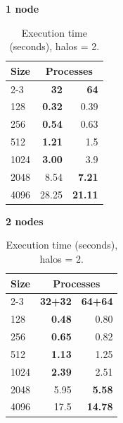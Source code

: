 \begin{table}[H]
\centering
\begin{minipage}[t]{0.48\textwidth}
\centering
\textbf{1 node}\\
\begin{tabular}{l|rr}
\hline
\textbf{Size} & \multicolumn{2}{c}{\textbf{Processes}} \\
\cline{2-3}
 & \textbf{32} & \textbf{64} \\
\hline
128 & \textbf{0.32} & 0.39 \\
256 & \textbf{0.54} & 0.63 \\
512 & \textbf{1.21} & 1.5 \\
1024 & \textbf{3.00} & 3.9 \\
2048 & 8.54 & \textbf{7.21} \\
4096 & 28.25 & \textbf{21.11} \\
\hline
\end{tabular}
\end{minipage}
\hfill
\begin{minipage}[t]{0.48\textwidth}
\centering
\textbf{2 nodes}\\
\begin{tabular}{l|rr}
\hline
\textbf{Size} & \multicolumn{2}{c}{\textbf{Processes}} \\
\cline{2-3}
 & \textbf{32+32} & \textbf{64+64} \\
\hline
128 & \textbf{0.48} & 0.80 \\
256 & \textbf{0.65} & 0.82 \\
512 & \textbf{1.13} & 1.25 \\
1024 & \textbf{2.39} & 2.51 \\
2048 & 5.95 & \textbf{5.58} \\
4096 & 17.5 & \textbf{14.78} \\
\hline
\end{tabular}
\end{minipage}
\caption{Execution time (seconds), halos = 2.}
\end{table}

